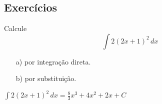 

\subsection{Exercícios}

\begin{exer}
  Calcule
  \begin{equation}
    \int 2(2x+1)^2\,dx
  \end{equation}
  \begin{enumerate}[a)]
  \item[a)] por integração direta.
  \item[b)] por substituição.
  \end{enumerate}
\end{exer}
\begin{resp}
  $\displaystyle \int 2(2x+1)^2\,dx = \frac{8}{3}x^3 + 4x^2 + 2x + C$
\end{resp}

